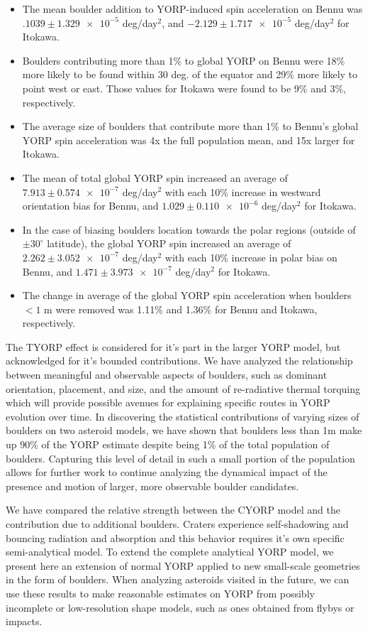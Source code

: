 \begin{itemize}
    \item The mean boulder addition to YORP-induced spin acceleration on Bennu was $.1039 \pm \num{1.329e-5}$ deg/day$^2$, and $\num{-2.129} \pm \num{1.717e-5}$ deg/day$^2$ for Itokawa.
    \item Boulders contributing more than 1\% to global YORP on Bennu were 18\% more likely to be found within 30 deg. of the equator and 29\% more likely to point west or east. Those values for Itokawa were found to be 9\% and 3\%, respectively. 
    \item The average size of boulders that contribute more than 1\% to Bennu's global YORP spin acceleration was 4x the full population mean, and 15x larger for Itokawa.
    \item The mean of total global YORP spin increased an average of $7.913 \pm \num{0.574e-7}$ deg/day$^2$ with each 10\% increase in westward orientation bias for Bennu, and $1.029 \pm \num{0.110e-6}$ deg/day$^2$ for Itokawa.
    \item In the case of biasing boulders location towards the polar regions (outside of $\pm 30^{\circ}$ latitude), the global YORP spin increased an average of $2.262 \pm \num{3.052e-7}$ deg/day$^2$ with each 10\% increase in polar bias on Bennu, and $1.471 \pm \num{3.973e-7}$ deg/day$^2$ for Itokawa.
    \item The change in average of the global YORP spin acceleration when boulders $< 1$ m were removed was 1.11\% and 1.36\% for Bennu and Itokawa, respectively.
\end{itemize}

The TYORP effect is considered for it's part in the larger YORP model, but acknowledged for it's bounded contributions. We have analyzed the relationship between meaningful and observable aspects of boulders, such as dominant orientation, placement, and size, and the amount of re-radiative thermal torquing which will provide possible avenues for explaining specific routes in YORP evolution over time. In discovering the statistical contributions of varying sizes of boulders on two asteroid models, we have shown that boulders less than 1m make up 90\% of the YORP estimate despite being 1\% of the total population of boulders. Capturing this level of detail in such a small portion of the population allows for further work to continue analyzing the dynamical impact of the presence and motion of larger, more observable boulder candidates. 

We have compared the relative strength between the CYORP model and the contribution due to additional boulders. Craters experience self-shadowing and bouncing radiation and absorption and this behavior requires it's own specific semi-analytical model. To extend the complete analytical YORP model, we present here an extension of normal YORP applied to new small-scale geometries in the form of boulders. When analyzing asteroids visited in the future, we can use these results to make reasonable estimates on YORP from possibly incomplete or low-resolution shape models, such as ones obtained from flybys or impacts.

